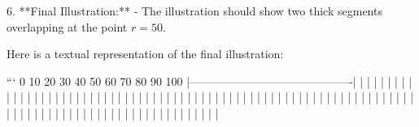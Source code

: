 6. **Final Illustration:**
   - The illustration should show two thick segments overlapping at the point \( r = 50 \).

Here is a textual representation of the final illustration:

```
0  10  20  30  40  50  60  70  80  90  100
|-------------------------------------------|
|                                           |
|                                           |
|                                           |
|                                           |
|                                           |
|                                           |
|                                           |
|                                           |
|                                           |
|                                           |
|                                           |
|                                           |
|                                           |
|                                           |
|                                           |
|                                           |
|                                           |
|                                           |
|                                           |
|                                           |
|                                           |
|                                           |
|                                           |
|                                           |
|                                           |
|                                           |
|                                           |
|                                           |
|                                           |
|                                           |
|                                           |
|                                           |
|                                           |
|                                           |
|                                           |
|                                           |
|                                           |
|                                           |
|                                           |
|                                           |
|                                           |
|                                           |
|                                           |
|                                           |
|                                           |
|                                           |
|                                           |
|                                           |
|                                           |
